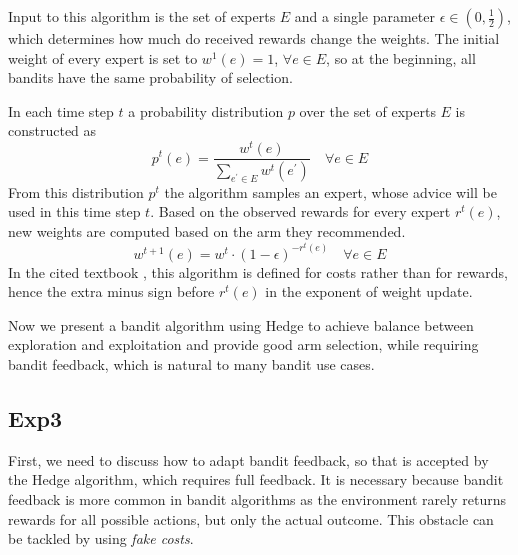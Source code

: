 \documentclass[../main.tex]{subfiles}
\begin{document}
Input to this algorithm is the set of experts $E$ and a single parameter $\epsilon \in \left(0, \frac{1}{2}\right)$, which determines how much do received rewards change the weights.
The initial weight of every expert is set to $w^1(e) = 1$, $\forall e \in E$, so at the beginning, all bandits have the same probability of selection.

In each time step $t$ a probability distribution $p$ over the set of experts $E$ is constructed as
\begin{equation}\label{bandit:adversarial:hedge:prob}
    p^t(e) = \frac{w^t(e)}{\displaystyle\sum_{e^{\prime} \in E} w^t(e^{\prime})} \quad \forall e \in E
\end{equation}
From this distribution $p^t$ the algorithm samples an expert, whose advice will be used in this time step $t$.
Based on the observed rewards for every expert $r^t(e)$, new weights are computed based on the arm they recommended.
\begin{equation}\label{bandit:adversarial:hedge:weight}
    w^{t+1}(e) = w^t \cdot (1 - \epsilon)^{-r^t(e)} \quad \forall e \in E
\end{equation}
In the cited textbook \cite{bandits}, this algorithm is defined for costs rather than for rewards, hence the extra minus sign before $r^t(e)$ in the exponent of weight update.

Now we present a bandit algorithm using Hedge to achieve balance between exploration and exploitation and provide good arm selection, while requiring bandit feedback, which is natural to many bandit use cases.

\subsection{Exp3}\label{bandit:adversarial:exp3}
First, we need to discuss how to adapt bandit feedback, so that is accepted by the Hedge algorithm, which requires full feedback.
It is necessary because bandit feedback is more common in bandit algorithms as the environment rarely returns rewards for all possible actions, but only the actual outcome.
This obstacle can be tackled by using \textit{fake costs}.
\end{document}
